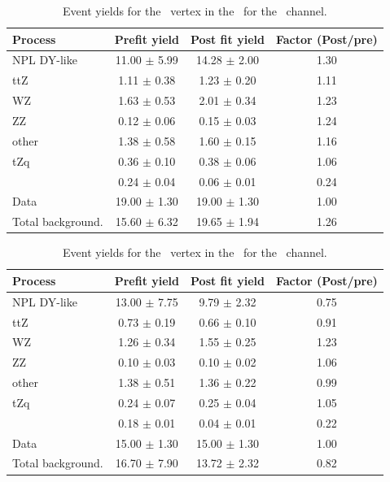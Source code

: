 \begin{table}[htbp]
	\centering
	\caption{Event yields for the \Zut\ vertex in the \TTCR\  for the \mumumu\ channel. }
	\begin{tabular} {l c c c }
		\toprule
		Process & Prefit yield & Post fit yield & Factor (Post/pre) \\
		\midrule
		NPL DY-like & 11.00 $ \pm $ 5.99 & 14.28 $ \pm $ 2.00 & 1.30 \\ 
		ttZ & 1.11 $ \pm $ 0.38 & 1.23 $ \pm $ 0.20 & 1.11 \\ 
		WZ & 1.63 $ \pm $ 0.53 & 2.01 $ \pm $ 0.34 & 1.23 \\ 
		ZZ & 0.12 $ \pm $ 0.06 & 0.15 $ \pm $ 0.03 & 1.24 \\ 
		other & 1.38 $ \pm $ 0.58 & 1.60 $ \pm $ 0.15 & 1.16 \\ 
		tZq & 0.36 $ \pm $ 0.10 & 0.38 $ \pm $ 0.06 & 1.06 \\ 
		\kZut  & 0.24 $ \pm $ 0.04 & 0.06 $ \pm $ 0.01 & 0.24\\
		\hdashline
		Data & 19.00 $ \pm $ 1.30 & 19.00 $ \pm $ 1.30 & 1.00\\
		Total background. & 15.60 $ \pm $ 6.32 & 19.65 $ \pm $ 1.94 & 1.26\\
		\bottomrule
	\end{tabular}
\end{table}
\begin{table}[htbp]
	\centering
	\caption{Event yields for the \Zut\ vertex in the \TTCR\  for the \emumu\ channel. }
	\begin{tabular} {l c c c }
		\toprule
		Process & Prefit yield & Post fit yield & Factor (Post/pre) \\
		\midrule
		NPL DY-like & 13.00 $ \pm $ 7.75 & 9.79 $ \pm $ 2.32 & 0.75 \\ 
		ttZ & 0.73 $ \pm $ 0.19 & 0.66 $ \pm $ 0.10 & 0.91 \\ 
		WZ & 1.26 $ \pm $ 0.34 & 1.55 $ \pm $ 0.25 & 1.23 \\ 
		ZZ & 0.10 $ \pm $ 0.03 & 0.10 $ \pm $ 0.02 & 1.06 \\ 
		other & 1.38 $ \pm $ 0.51 & 1.36 $ \pm $ 0.22 & 0.99 \\ 
		tZq & 0.24 $ \pm $ 0.07 & 0.25 $ \pm $ 0.04 & 1.05 \\ 
		\kZut  & 0.18 $ \pm $ 0.01 & 0.04 $ \pm $ 0.01 & 0.22\\
		\hdashline
		Data & 15.00 $ \pm $ 1.30 & 15.00 $ \pm $ 1.30 & 1.00\\
		Total background. & 16.70 $ \pm $ 7.90 & 13.72 $ \pm $ 2.32 & 0.82\\
		\bottomrule
	\end{tabular}
\end{table}
